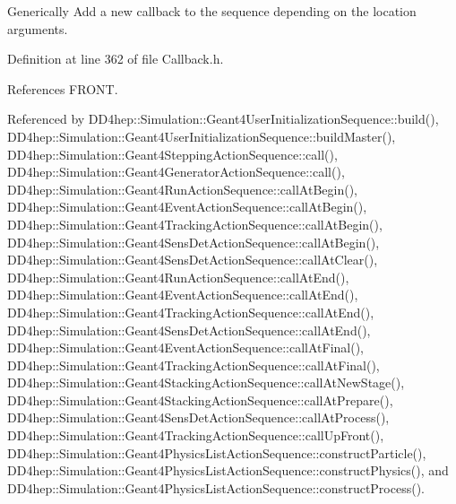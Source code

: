 Generically Add a new callback to the sequence depending on the location arguments. 



Definition at line 362 of file Callback.\+h.



References F\+R\+O\+NT.



Referenced by D\+D4hep\+::\+Simulation\+::\+Geant4\+User\+Initialization\+Sequence\+::build(), D\+D4hep\+::\+Simulation\+::\+Geant4\+User\+Initialization\+Sequence\+::build\+Master(), D\+D4hep\+::\+Simulation\+::\+Geant4\+Stepping\+Action\+Sequence\+::call(), D\+D4hep\+::\+Simulation\+::\+Geant4\+Generator\+Action\+Sequence\+::call(), D\+D4hep\+::\+Simulation\+::\+Geant4\+Run\+Action\+Sequence\+::call\+At\+Begin(), D\+D4hep\+::\+Simulation\+::\+Geant4\+Event\+Action\+Sequence\+::call\+At\+Begin(), D\+D4hep\+::\+Simulation\+::\+Geant4\+Tracking\+Action\+Sequence\+::call\+At\+Begin(), D\+D4hep\+::\+Simulation\+::\+Geant4\+Sens\+Det\+Action\+Sequence\+::call\+At\+Begin(), D\+D4hep\+::\+Simulation\+::\+Geant4\+Sens\+Det\+Action\+Sequence\+::call\+At\+Clear(), D\+D4hep\+::\+Simulation\+::\+Geant4\+Run\+Action\+Sequence\+::call\+At\+End(), D\+D4hep\+::\+Simulation\+::\+Geant4\+Event\+Action\+Sequence\+::call\+At\+End(), D\+D4hep\+::\+Simulation\+::\+Geant4\+Tracking\+Action\+Sequence\+::call\+At\+End(), D\+D4hep\+::\+Simulation\+::\+Geant4\+Sens\+Det\+Action\+Sequence\+::call\+At\+End(), D\+D4hep\+::\+Simulation\+::\+Geant4\+Event\+Action\+Sequence\+::call\+At\+Final(), D\+D4hep\+::\+Simulation\+::\+Geant4\+Tracking\+Action\+Sequence\+::call\+At\+Final(), D\+D4hep\+::\+Simulation\+::\+Geant4\+Stacking\+Action\+Sequence\+::call\+At\+New\+Stage(), D\+D4hep\+::\+Simulation\+::\+Geant4\+Stacking\+Action\+Sequence\+::call\+At\+Prepare(), D\+D4hep\+::\+Simulation\+::\+Geant4\+Sens\+Det\+Action\+Sequence\+::call\+At\+Process(), D\+D4hep\+::\+Simulation\+::\+Geant4\+Tracking\+Action\+Sequence\+::call\+Up\+Front(), D\+D4hep\+::\+Simulation\+::\+Geant4\+Physics\+List\+Action\+Sequence\+::construct\+Particle(), D\+D4hep\+::\+Simulation\+::\+Geant4\+Physics\+List\+Action\+Sequence\+::construct\+Physics(), and D\+D4hep\+::\+Simulation\+::\+Geant4\+Physics\+List\+Action\+Sequence\+::construct\+Process().

\hypertarget{struct_d_d4hep_1_1_callback_sequence_a1042f1cdfe92acfb96e5f84b343a15d0}{}\label{struct_d_d4hep_1_1_callback_sequence_a1042f1cdfe92acfb96e5f84b343a15d0} 
